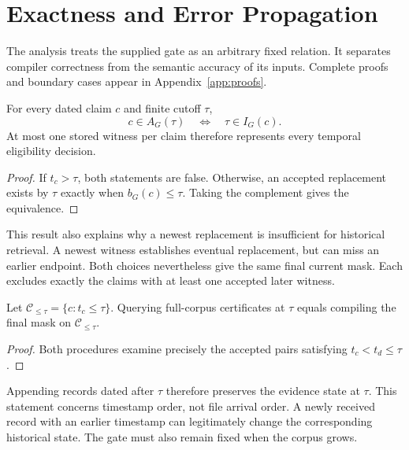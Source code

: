 \section{Exactness and Error Propagation}
\label{sec:theory}

The analysis treats the supplied gate as an arbitrary fixed relation.
It separates compiler correctness from the semantic accuracy of its inputs.
Complete proofs and boundary cases appear in Appendix~\ref{app:proofs}.

\begin{theorem}
\label{thm:cutoff}
For every dated claim $c$ and finite cutoff $\tau$,
\begin{equation}
c\in A_G(\tau)\quad\Longleftrightarrow\quad\tau\in I_G(c).
\label{eq:equivalence}
\end{equation}
At most one stored witness per claim therefore represents every temporal eligibility decision.
\end{theorem}
\begin{proof}
If $t_c>\tau$, both statements are false.
Otherwise, an accepted replacement exists by $\tau$ exactly when $b_G(c)\leq\tau$.
Taking the complement gives the equivalence.
\end{proof}

This result also explains why a newest replacement is insufficient for historical retrieval.
A newest witness establishes eventual replacement, but can miss an earlier endpoint.
Both choices nevertheless give the same final current mask.
Each excludes exactly the claims with at least one accepted later witness.

\begin{corollary}
\label{cor:prefix}
Let $\mathcal C_{\leq\tau}=\{c:t_c\leq\tau\}$.
Querying full-corpus certificates at $\tau$ equals compiling the final mask on $\mathcal C_{\leq\tau}$.
\end{corollary}
\begin{proof}
Both procedures examine precisely the accepted pairs satisfying $t_c<t_d\leq\tau$.
\end{proof}

Appending records dated after $\tau$ therefore preserves the evidence state at $\tau$.
This statement concerns timestamp order, not file arrival order.
A newly received record with an earlier timestamp can legitimately change the corresponding historical state.
The gate must also remain fixed when the corpus grows.

